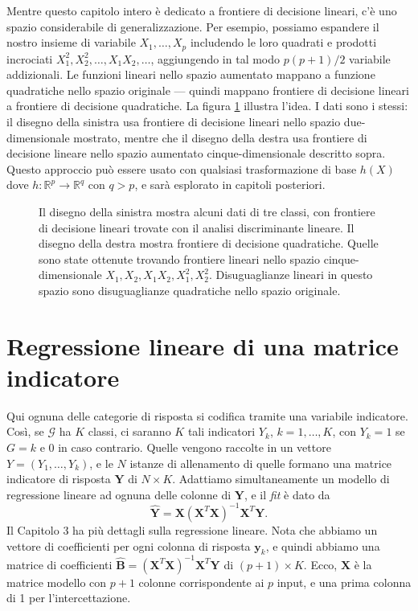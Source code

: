 \documentclass[11pt,openany]{book}
\begin{document}
Mentre questo capitolo intero è dedicato a frontiere di decisione lineari, c'è uno spazio considerabile di generalizzazione. Per esempio, possiamo espandere il nostro insieme di variabile $X_1, \dots, X_p$ includendo le loro quadrati e prodotti incrociati $X_1^2, X_2^2, \dots, X_1 X_2, \dots$, aggiungendo in tal modo $p(p + 1)/2$ variabile addizionali. Le funzioni lineari nello spazio aumentato mappano a funzione quadratiche nello spazio originale --- quindi mappano frontiere di decisione lineari a frontiere di decisione quadratiche. La figura \ref{fig4-1} illustra l'idea. I dati sono i stessi: il disegno della sinistra usa frontiere di decisione lineari nello spazio due-dimensionale mostrato, mentre che il disegno della destra usa frontiere di decisione lineare nello spazio aumentato cinque-dimensionale descritto sopra. Questo approccio può essere usato con qualsiasi trasformazione di base $h(X)$ dove $h : \mathbb{R}^p \to \mathbb{R}^q$ con $q > p$, e sarà esplorato in capitoli posteriori.\\

\begin{figure}
\label{fig4-1}
\caption{Il disegno della sinistra mostra alcuni dati di tre classi, con frontiere di decisione lineari trovate con il analisi discriminante lineare. Il disegno della destra mostra frontiere di decisione quadratiche. Quelle sono state ottenute trovando frontiere lineari nello spazio cinque-dimensionale $X_1, X_2, X_1 X_2, X_1^2, X_2^2$. Disuguaglianze lineari in questo spazio sono disuguaglianze quadratiche nello spazio originale.}
\end{figure}


\section{Regressione lineare di una matrice indicatore}

Qui ognuna delle categorie di risposta si codifica tramite una variabile indicatore. Così, se $\mathcal{G}$ ha $K$ classi, ci saranno $K$ tali indicatori $Y_k$, $k = 1, \dots, K$, con $Y_k = 1$ se $G = k$ e $0$ in caso contrario. Quelle vengono raccolte in un vettore $Y = (Y_1, \dots, Y_k)$, e le $N$ istanze di allenamento di quelle formano una matrice indicatore di risposta $\mathbf{Y}$ di $N \times K$. Adattiamo simultaneamente un modello di regressione lineare ad ognuna delle colonne di $\mathbf{Y}$, e il \textit{fit} è dato da
\begin{equation}
\label{eq4-3}
\hat{\mathbf{Y}} = \mathbf{X} \left( \mathbf{X}^T \mathbf{X} \right)^{-1} \mathbf{X}^T \mathbf{Y}.
\end{equation}
Il Capitolo 3 ha più dettagli sulla regressione lineare. Nota che abbiamo un vettore di coefficienti per ogni colonna di risposta $\mathbf{y}_k$, e quindi abbiamo una matrice di coefficienti $\hat{\mathbf{B}} = \left( \mathbf{X}^T \mathbf{X} \right)^{-1}\mathbf{X}^T \mathbf{Y}$ di $(p + 1) \times K$. Ecco, $\mathbf{X}$ è la matrice modello con $p + 1$ colonne corrispondente ai $p$ input, e una prima colonna di 1 per l'intercettazione.
\end{document}

